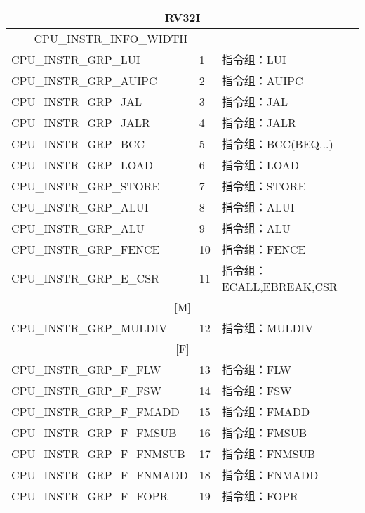 \begin{table}[H]
    \centering
\begin{tabular}{|l|p{3cm}|p{6cm}|}
    \hline
    \multicolumn{3}{|c|}{RV32I}\\\hline
    \multicolumn{2}{|c|}{CPU\_INSTR\_INFO\_WIDTH}&\\\hline
    CPU\_INSTR\_GRP\_LUI & 1 & 指令组：LUI\\\hline
    CPU\_INSTR\_GRP\_AUIPC & 2 & 指令组：AUIPC\\\hline
    CPU\_INSTR\_GRP\_JAL & 3 & 指令组：JAL\\\hline
    CPU\_INSTR\_GRP\_JALR & 4 & 指令组：JALR\\\hline
    CPU\_INSTR\_GRP\_BCC & 5 & 指令组：BCC(BEQ...)\\\hline
    CPU\_INSTR\_GRP\_LOAD & 6 & 指令组：LOAD\\\hline
    CPU\_INSTR\_GRP\_STORE & 7 & 指令组：STORE\\\hline
    CPU\_INSTR\_GRP\_ALUI & 8 & 指令组：ALUI\\\hline
    CPU\_INSTR\_GRP\_ALU & 9 & 指令组：ALU\\\hline
    CPU\_INSTR\_GRP\_FENCE & 10 & 指令组：FENCE\\\hline
    CPU\_INSTR\_GRP\_E\_CSR & 11 & 指令组：ECALL,EBREAK,CSR\\\hline
    \multicolumn{3}{|c|}{[M]}\\\hline
    CPU\_INSTR\_GRP\_MULDIV & 12 & 指令组：MULDIV\\\hline
    \multicolumn{3}{|c|}{[F]}\\\hline
    CPU\_INSTR\_GRP\_F\_FLW & 13 & 指令组：FLW\\\hline
    CPU\_INSTR\_GRP\_F\_FSW & 14 & 指令组：FSW\\\hline
    CPU\_INSTR\_GRP\_F\_FMADD & 15 & 指令组：FMADD\\\hline
    CPU\_INSTR\_GRP\_F\_FMSUB & 16 & 指令组：FMSUB\\\hline
    CPU\_INSTR\_GRP\_F\_FNMSUB & 17 & 指令组：FNMSUB\\\hline
    CPU\_INSTR\_GRP\_F\_FNMADD & 18 & 指令组：FNMADD\\\hline
    CPU\_INSTR\_GRP\_F\_FOPR & 19 & 指令组：FOPR\\\hline
\end{tabular}
\end{table}